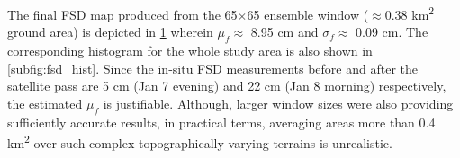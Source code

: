 \documentclass{article}
\begin{document}
The final FSD map produced from the 65$\times$65 ensemble window ($\approx$0.38 km\textsuperscript{2} ground area) is depicted in \ref{subfig:fsd_map} wherein $\mu_f \approx$ 8.95 cm and $\sigma_f \approx$ 0.09 cm. The corresponding histogram for the whole study area is also shown in \ref{subfig:fsd_hist}. Since the in-situ FSD measurements before and after the satellite pass are 5 cm (Jan 7 evening) and 22 cm (Jan 8 morning) respectively, the estimated $\mu_f$ is justifiable. Although, larger window sizes were also providing sufficiently accurate results, in practical terms, averaging areas more than 0.4 km\textsuperscript{2} over such complex topographically varying terrains is unrealistic.

\begin{figure}[htb]
    \centering
    \begin{subfigure}[t]{0.49\columnwidth}
        \caption{}
        \label{subfig:fsd_map}
    \end{subfigure}
    \hfill
    \begin{subfigure}[t]{0.49\columnwidth}

\end{subfigure}
\end{figure}
\end{document}
